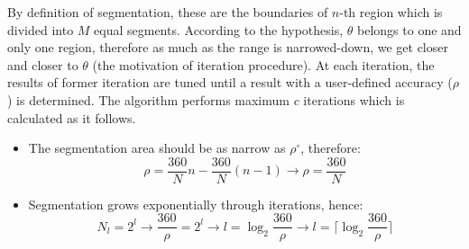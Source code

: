 \noindent
By definition of segmentation, these are the boundaries of $n$-th region which is divided into $M$ equal segments. According to the hypothesis, $\theta$ belongs to one and only one region, therefore as much as the range is narrowed-down, we get closer and closer to $\theta$ (the motivation of iteration procedure).
At each iteration, the results of former iteration are tuned until a result with a user-defined accuracy ($\rho$) is determined. The algorithm performs maximum $c$ iterations which is calculated as it follows.
\begin{itemize}
	\item The segmentation area should be as narrow as $\rho^\circ$, therefore: 
	\begin{equation}
	\rho = \frac{360}{N}n- \frac{360}{N}(n-1) \rightarrow \rho = \frac{360}{N}
	\end{equation}
	
	\item Segmentation grows exponentially through iterations, hence:
	\begin{equation}
	N_l = 2^l \rightarrow \frac{360}{\rho} = 2^l \rightarrow l = \log_2 \frac{360}{\rho} \rightarrow l = \lceil \log_2 \frac{360}{\rho} \rceil
	\end{equation}
\end{itemize}
